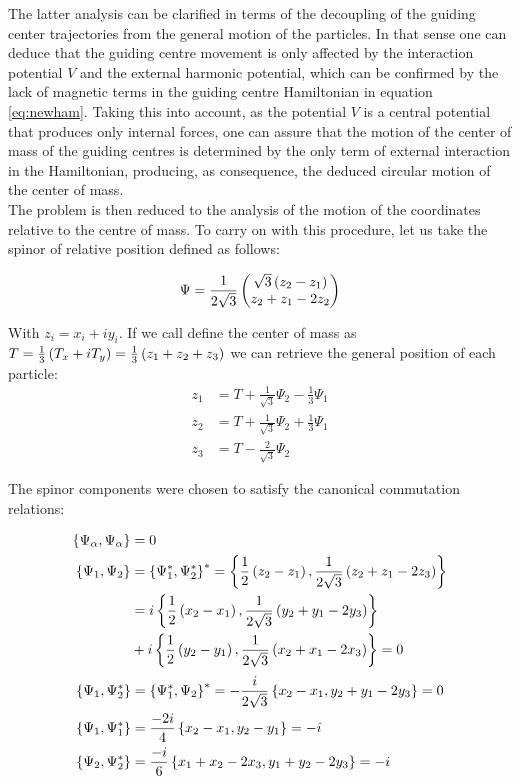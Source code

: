 The latter analysis can be clarified in terms of the decoupling of the guiding center trajectories from the general motion of the particles. In that sense one can deduce that the guiding centre movement is only affected by the interaction potential $V$ and the external harmonic potential, which can be confirmed by the lack of magnetic terms in the guiding centre Hamiltonian in equation \eqref{eq:newham}. Taking this into account, as the potential $V$ is a central potential that produces only internal forces, one can assure that the motion of the center of mass of the guiding centres is determined by the only term of external interaction in the Hamiltonian, producing, as consequence, the deduced circular motion of the center of mass.\\

The problem is then reduced to the analysis of the motion of the coordinates relative to the centre of mass. To carry on with this procedure, let us take the spinor of relative position defined as follows:

\begin{align}
\Psi = \frac{1}{2\sqrt{3}}\begin{pmatrix}\sqrt{3}\left( z_{2}-z_{1} \right)\\
z_{2}+z_{1}-2z_{2}\end{pmatrix}
\end{align}

With $z_{i} = x_i + iy_i$. If we call define the center of mass as $T = \frac{1}{3}\left( T_x + iT_y \right) = \frac{1}{3}\left( z_1 +z_2+z_3 \right)$ we can retrieve the general position of each particle:
\small
\begin{align*}
z_1 &= T+\frac{1}{\sqrt{3}}\Psi_2 - \frac{1}{3}\Psi_1 \\
z_2 &= T+\frac{1}{\sqrt{3}}\Psi_2 + \frac{1}{3}\Psi_1 \\
z_3 &= T-\frac{2}{\sqrt{3}}\Psi_2
\end{align*}
\normalsize

The spinor components were chosen to satisfy the canonical commutation relations:

\small
\begin{align*}
\left\lbrace \Psi_\alpha, \Psi_\alpha \right\rbrace &= 0\\ 
\left\lbrace \Psi_1, \Psi_2 \right\rbrace &= \left\lbrace \Psi_1^*, \Psi_2^* \right\rbrace^* = \left\lbrace \frac{1}{2}\left( z_{2}-z_{1} \right), \frac{1}{2\sqrt{3}}\left( z_{2}+z_{1}-2z_{3} \right) \right\rbrace \\
&= i\left\lbrace \frac{1}{2}\left( x_{2}-x_{1} \right), \frac{1}{2\sqrt{3}}\left( y_{2}+y_{1}-2y_{3} \right) \right\rbrace\\
&+ i\left\lbrace \frac{1}{2}\left( y_{2}-y_{1} \right), \frac{1}{2\sqrt{3}}\left( x_{2}+x_{1}-2x_{3} \right) \right\rbrace = 0\\
\end{align*}
\small
\begin{align*}
\left\lbrace \Psi_1, \Psi_2^* \right\rbrace &= \left\lbrace \Psi_1^*, \Psi_2 \right\rbrace^* = -\frac{i}{2\sqrt{3}}\left\lbrace x_{2}-x_{1}, y_{2}+y_{1}-2y_{3} \right\rbrace = 0\\
\left\lbrace \Psi_1, \Psi_1^* \right\rbrace &= \frac{-2i}{4}\left\lbrace x_{2}-x_{1}, y_2-y_1 \right\rbrace = -i\\
\left\lbrace \Psi_2, \Psi_2^* \right\rbrace &= \frac{-i}{6}\left\lbrace x_{1}+x_{2}-2x_3, y_1+y_2-2y_3 \right\rbrace = -i
\end{align*}
\normalsize

